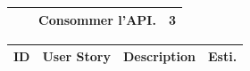 \begin{table}[H]
\begin{tabular}{|l|l|l|l|}
		&                                                                                                                                                                         & Consommer l'API.                                                                                                                                                         & 3              \\ \hline	
		\end{tabular}
	\end{table}
\begin{table}[H]
	\begin{tabular}{|l|l|l|l|}
		\hline
		\textbf{ID}          & \textbf{User Story}                                                                                                                                                     & \textbf{Description}                                                                                                                                                     & \textbf{Esti.} \\ \hline
	

\end{tabular}
\end{table}
